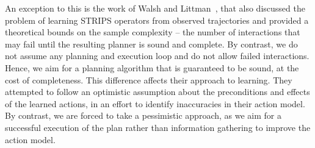 \documentclass[letterpaper]{article}
\begin{document}

An exception to this is the work of Walsh and Littman~, that also discussed the problem of learning STRIPS operators from observed trajectories and provided a theoretical bounds on the sample complexity -- the number of interactions that may fail until the resulting planner is  sound and complete.  By contrast, we do not assume any planning and execution loop and do not allow failed interactions. Hence, we aim for a planning algorithm that is guaranteed to be sound, at the cost of completeness. This difference affects their approach to learning. They attempted to follow an optimistic assumption about the preconditions and effects of the learned actions, in an effort to identify inaccuracies in their action model. By contrast, we are forced to take a pessimistic approach, as we aim for a successful execution of the plan rather than information gathering to improve the action model. 
\end{document}
